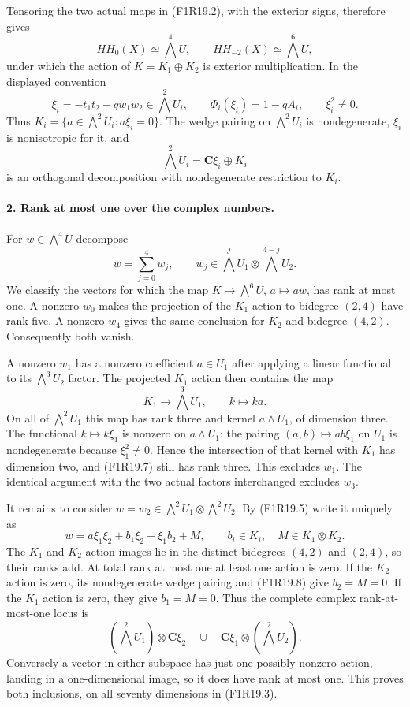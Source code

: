 Tensoring the two actual maps in (F1R19.2), with the
exterior signs, therefore gives
\[
       HH_0(X)\simeq\bigwedge^4U,\qquad
       HH_{-2}(X)\simeq\bigwedge^6U,
 \tag{F1R19.3}
\]
under which the action of $K=K_1\oplus K_2$ is
exterior multiplication. In the displayed convention
\[
 \xi_i=-t_1t_2-qw_1w_2\in\bigwedge^2U_i,
   \qquad \Phi_i(\xi_i)=1-qA_i,\qquad \xi_i^2\ne0.
 \tag{F1R19.4}
\]
Thus $K_i=\{a\in\bigwedge^2U_i:a\xi_i=0\}$.
The wedge pairing on $\bigwedge^2U_i$ is nondegenerate,
$\xi_i$ is nonisotropic for it, and
\[
                   \bigwedge^2U_i=\mathbf C\xi_i\oplus K_i
 \tag{F1R19.5}
\]
is an orthogonal decomposition with nondegenerate
restriction to $K_i$.

\paragraph{2. Rank at most one over the complex numbers.}
For $w\in\bigwedge^4U$ decompose
\[
 w=\sum_{j=0}^4 w_j,\qquad
 w_j\in\bigwedge^jU_1\otimes\bigwedge^{4-j}U_2.
 \tag{F1R19.6}
\]
We classify the vectors for which the map
$K\to\bigwedge^6U$, $a\mapsto aw$, has rank at
most one. A nonzero $w_0$ makes the projection of
the $K_1$ action to bidegree $(2,4)$ have rank five.
A nonzero $w_4$ gives the same conclusion for $K_2$
and bidegree $(4,2)$. Consequently both vanish.

A nonzero $w_1$ has a nonzero coefficient
$a\in U_1$ after applying a linear functional to
its $\bigwedge^3U_2$ factor. The projected $K_1$
action then contains the map
\[
                    K_1\longrightarrow\bigwedge^3U_1,
                               \qquad k\longmapsto ka.
 \tag{F1R19.7}
\]
On all of $\bigwedge^2U_1$ this map has rank three
and kernel $a\wedge U_1$, of dimension three.
The functional $k\mapsto k\xi_1$ is nonzero on
$a\wedge U_1$: the pairing
$(a,b)\mapsto a b\xi_1$ on $U_1$ is nondegenerate
because $\xi_1^2\ne0$. Hence the intersection of
that kernel with $K_1$ has dimension two, and
(F1R19.7) still has rank three. This excludes $w_1$.
The identical argument with the two actual factors
interchanged excludes $w_3$.

It remains to consider
$w=w_2\in\bigwedge^2U_1\otimes\bigwedge^2U_2$.
By (F1R19.5) write it uniquely as
\[
 w=a\xi_1\xi_2+b_1\xi_2+\xi_1b_2+M,
       \qquad b_i\in K_i,\quad M\in K_1\otimes K_2.
 \tag{F1R19.8}
\]
The $K_1$ and $K_2$ action images lie in the distinct
bidegrees $(4,2)$ and $(2,4)$, so their ranks add.
At total rank at most one at least one action is zero.
If the $K_2$ action is zero, its nondegenerate wedge
pairing and (F1R19.8) give $b_2=M=0$. If the $K_1$
action is zero, they give $b_1=M=0$. Thus the complete
complex rank-at-most-one locus is
\[
 \left(\bigwedge^2U_1\right)\otimes\mathbf C\xi_2
 \quad\cup\quad
 \mathbf C\xi_1\otimes\left(\bigwedge^2U_2\right).
 \tag{F1R19.9}
\]
Conversely a vector in either subspace has just one
possibly nonzero action, landing in a one-dimensional
image, so it does have rank at most one. This proves
both inclusions, on all seventy dimensions in (F1R19.3).

